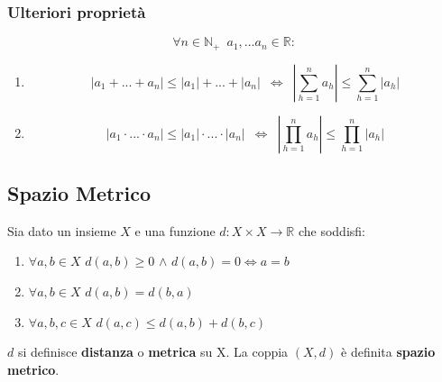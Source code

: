 \documentclass[10pt]{article}
\theoremstyle{plain}
\begin{document}
\subsubsection*{Ulteriori proprietà}
\begin{prop}
    \[\forall n \in \mathbb{N}_+ \enspace a_1, ... a_n \in \mathbb{R} :\]
    \begin{enumerate}
        \item 
        \[|a_1 + ... + a_n| \leq |a_1| + ... + |a_n| \enspace \Leftrightarrow \enspace |\sum \limits_{h=1}^n a_h| \leq \sum \limits_{h=1}^n |a_h|\]
        \item
        \[|a_1 \cdot ... \cdot a_n| \leq |a_1| \cdot ... \cdot |a_n| \enspace \Leftrightarrow \enspace |\prod \limits_{h=1}^n a_h| \leq \prod \limits_{h=1}^n |a_h|\]
    \end{enumerate}
\end{prop}

\subsection{Spazio Metrico}
\begin{defin}
    Sia dato un insieme $X$ e una funzione $d : X \times X \rightarrow \mathbb{R}$ che soddisfi:
    \begin{enumerate}
        \item $\forall a,b \in X$ $d(a,b) \geq 0$ $\land$ $d(a,b) = 0 \Leftrightarrow a = b$
        \item $\forall a,b \in X$ $d(a,b) = d(b,a)$
        \item$\forall a,b,c \in X$ $d(a,c) \leq d(a,b) + d(b,c)$
    \end{enumerate}
    $d$ si definisce \textbf{distanza} o \textbf{metrica} su X. La coppia $(X,d)$ è definita \textbf{spazio metrico}.
\end{defin}
\end{document}
